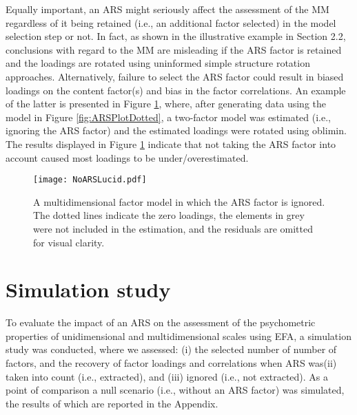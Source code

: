 \documentclass[a4paper,man,natbib]{apa6}
\begin{document}
\begin{linenumbers}
Equally important, an ARS might seriously affect the assessment of the MM regardless of it being retained (i.e., an additional factor selected) in the model selection step or not. In fact, as shown in the illustrative example in Section 2.2, conclusions with regard  to the MM are misleading if the ARS factor is retained and the loadings are rotated using uninformed simple structure rotation approaches. Alternatively, failure to select the ARS factor could result in biased loadings on the content factor(s) and bias in the factor correlations. An example of the latter is presented in Figure \ref{fig:NoARSPlotDotted}, where, after generating data using the model in Figure \ref{fig:ARSPlotDotted}, a two-factor model was estimated (i.e., ignoring the ARS factor) and the estimated loadings were rotated using oblimin. The results displayed in Figure \ref{fig:NoARSPlotDotted} indicate that not taking the ARS factor into account caused most loadings to be under/overestimated.

\begin{figure}[h]
	\centering
	\texttt{[image: NoARSLucid.pdf]}
	\caption {A multidimensional factor model in which the ARS factor is ignored. The dotted lines indicate the zero loadings, the elements in grey were not included in the estimation, and the residuals are omitted for visual clarity.}
	\label{fig:NoARSPlotDotted}
\end{figure}





\section{Simulation study}
To evaluate the impact of an ARS on the assessment of the psychometric properties of unidimensional and multidimensional scales using EFA, a simulation study was conducted, where we assessed: (i) the selected number of number of factors, and the recovery of factor loadings and correlations when ARS was(ii) taken into count (i.e., extracted), and (iii) ignored (i.e., not extracted). As a point of comparison a null scenario (i.e., without an ARS factor) was simulated, the results of which are reported in the Appendix.


\end{linenumbers}
\end{document}
